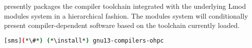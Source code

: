 \OHPC{} presently packages the \GNU{} compiler toolchain integrated with the
underlying Lmod modules system in a hierarchical fashion. The modules
system will conditionally present compiler-dependent software based on the
toolchain currently loaded.

\begin{lstlisting}[language=bash]
[sms](*\#*) (*\install*) gnu13-compilers-ohpc
\end{lstlisting}

